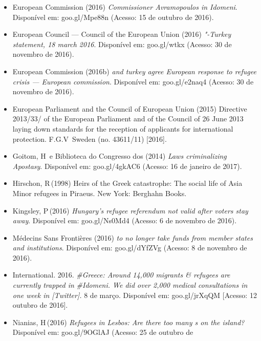 \begin{itemize}
{  on emergency relocation}. Disponível em: goo.gl/{WJ}0{RTK} (Acesso: 8 de
  novembro de 2016).
\item
  European Commission (2016) \emph{Commissioner Avramopoulos in
  Idomeni}. Disponível em: goo.gl/Mpe88n (Acesso: 15 de outubro de
  2016).
\item
  European Council --- Council of the European Union (2016)
  \emph{"-Turkey statement, 18 march 2016}. Disponível em:
  goo.gl/wtkx (Acesso: 30 de novembro de 2016).
\item
  European Commission (2016b) \emph{ and turkey agree European
  response to refugee crisis --- European commission}. Disponível em:
  goo.gl/e2naq4 (Acesso: 30 de novembro de 2016).
\item
  European Parliament and the Council of European Union (2015) Directive
  2013/33/ of the European Parliament and of the Council of 26 June
  2013 laying down standards for the reception of applicants for
  international protection. F.G.V\, Sweden (no. 43611/11) {[}2016{]}.
\item
  Goitom, H\, e Biblioteca do Congresso dos  (2014) \emph{Laws
  criminalizing Apostasy}. Disponível em: goo.gl/4gk{AC}6 (Acesso: 16 de
  janeiro de 2017).
\item
  Hirschon, R\,(1998) Heirs of the Greek catastrophe: The social life of
  Asia Minor refugees in Piraeus. New York: Berghahn Books.
\item
  Kingsley, P\,(2016) \emph{Hungary}\emph{'}\emph{s refugee referendum
  not valid after voters stay away}. Disponível em: goo.gl/Ns0Md4
  (Acesso: 6 de novembro de 2016).
\item
  Médecins Sans Frontières (2016) \emph{ to no longer take funds from
   member states and institutions}. Disponível em:
  goo.gl/dYfZVg
  (Acesso: 8 de novembro de 2016).
\item
   International. 2016.
  \emph{{\#Greece}}\emph{:
  Around 14,000 migrants \& refugees are currently trapped in}
  \emph{{\#Idomeni}}\emph{.
  We did over 2,000 medical consultations in one week in
   [Twitter]. }8 de março. Disponível em: goo.gl/jrXq{QM} {[}Acesso:
  12 outubro de 2016{]}.
\EP[2]\item
  Nianias, H\,(2016) \emph{Refugees in Lesbos: Are there too many s
  on the island?} Disponível em: goo.gl/9{OG}l{AJ} (Acesso: 25 de outubro de

\end{itemize}
